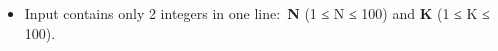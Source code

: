 \begin{itemize}
	\item Input contains only 2 integers in one line: \textbf{N} (1 ≤ N ≤ 100) and \textbf{K} (1 ≤ K ≤ 100).
\end{itemize}